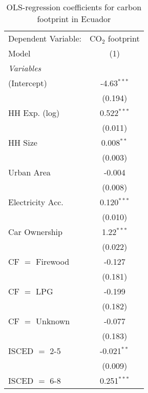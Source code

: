 
\begin{table}[htbp!]
   \centering
   \small
   \begin{adjustbox}{width = 1\textwidth, max height = 0.95\textheight, center}
      \begin{threeparttable}[b]
         \caption{\label{tab:OLS_2_ECU} OLS-regression coefficients for carbon footprint in Ecuador}
         \begin{tabular}{lc}
            \tabularnewline \midrule \midrule
            Dependent Variable: & CO$_{2}$ footprint\\  
            Model               & (1)\\  
            \midrule
            \emph{Variables}\\
            (Intercept)         & -4.63$^{***}$\\   
                                & (0.194)\\   
            HH Exp. (log)       & 0.522$^{***}$\\   
                                & (0.011)\\   
            HH Size             & 0.008$^{**}$\\   
                                & (0.003)\\   
            Urban Area          & -0.004\\   
                                & (0.008)\\   
            Electricity Acc.    & 0.120$^{***}$\\   
                                & (0.010)\\   
            Car Ownership       & 1.22$^{***}$\\   
                                & (0.022)\\   
            CF $=$ Firewood     & -0.127\\   
                                & (0.181)\\   
            CF $=$ LPG          & -0.199\\   
                                & (0.182)\\   
            CF $=$ Unknown      & -0.077\\   
                                & (0.183)\\   
            ISCED $=$ 2-5       & -0.021$^{**}$\\   
                                & (0.009)\\   
            ISCED $=$ 6-8       & 0.251$^{***}$\\   

\end{tabular}
\end{threeparttable}
\end{adjustbox}
\end{table}
